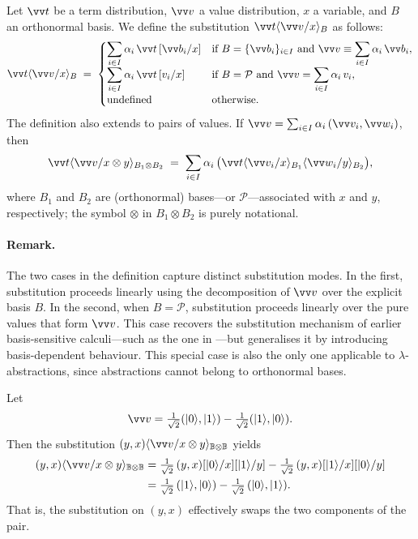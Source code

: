 \documentclass[runningheads,orivec,envcountsame,envcountsect]{llncs}
\newcommand\ket[1]{\ensuremath{|#1\rangle}}
\newcommand\ansubst[2]{\ensuremath{\langle #1 \rangle_{#2}}}
\newcommand\AbsBasis{\ensuremath{\mathcal{P}}}
\def\Pair#1#2{(#1,#2)} %
\def\ds{\displaystyle}
\newcommand\B{\mathbb B}
\begin{document}
\begin{definition}
  Let $\vv t$ be a term distribution, $\vv v$ a value distribution, $x$ a
  variable, and $B$ an orthonormal basis. We define the substitution
  $\vv t\ansubst{\vv v/x}{B}$ as follows:
  \[
    \vv t\ansubst{\vv v/x}{B} \;=\;
    \begin{cases}
      \ds\sum_{i\in I}\alpha_i\,\vv t\,[\vv b_i/x] &
        \text{if } B=\{\vv b_i\}_{i\in I}\ \text{and}\
        \vv v \equiv \ds\sum_{i\in I}\alpha_i\,\vv b_i,\\[6pt]
      \ds\sum_{i\in I}\alpha_i\,\vv t\,[v_i/x] &
        \text{if } B=\AbsBasis\ \text{and}\
        \vv v = \ds\sum_{i\in I}\alpha_i\,v_i,\\[2pt]
      \text{undefined} & \text{otherwise.}
    \end{cases}
  \]
  The definition also extends to pairs of values. If
  $\vv v=\sum_{i\in I}\alpha_i\,\Pair{\vv v_i}{\vv w_i}$, then
  \[
    \vv t\ansubst{\vv v/x\otimes y}{B_1\otimes B_2}
      \;=\; \sum_{i\in I}\alpha_i\,
      \bigl(\vv t\ansubst{\vv v_i/x}{B_1}\ansubst{\vv w_i/y}{B_2}\bigr),
  \]
  where $B_1$ and $B_2$ are (orthonormal) bases---or $\AbsBasis$---associated
  with $x$ and $y$, respectively; the symbol $\otimes$ in $B_1\otimes B_2$ is
  purely notational.
\end{definition}

\paragraph{Remark.}
The two cases in the definition capture distinct substitution modes.  
In the first, substitution proceeds linearly using the decomposition of
$\vv v$ over the explicit basis $B$.  
In the second, when $B=\AbsBasis$, substitution proceeds linearly over the pure
values that form $\vv v$.  
This case recovers the substitution mechanism of earlier
basis-sensitive calculi---such as the one in
\cite{DiazcaroGuillermoMiquelValironLICS19}---but generalises it by introducing
basis-dependent behaviour.  
This special case is also the only one applicable to
$\lambda$-abstractions, since abstractions cannot belong to orthonormal bases.


\begin{example}
  Let
  \[
    \vv v = \tfrac{1}{\sqrt{2}}\Pair{\ket{0}}{\ket{1}}
             - \tfrac{1}{\sqrt{2}}\Pair{\ket{1}}{\ket{0}}.
  \]
  Then the substitution $(y,x)\ansubst{\vv v/x\otimes y}{\B\otimes\B}$ yields
  \begin{align*}
    (y,x)\ansubst{\vv v/x\otimes y}{\B\otimes\B}
    &= \tfrac{1}{\sqrt{2}}\,(y,x)[\ket{0}/x][\ket{1}/y]
       - \tfrac{1}{\sqrt{2}}\,(y,x)[\ket{1}/x][\ket{0}/y] \\
    &= \tfrac{1}{\sqrt{2}}\,(\ket{1},\ket{0})
       - \tfrac{1}{\sqrt{2}}\,(\ket{0},\ket{1}).
  \end{align*}
  That is, the substitution on $(y,x)$ effectively swaps the two components of the pair.
\end{example}
\end{document}
